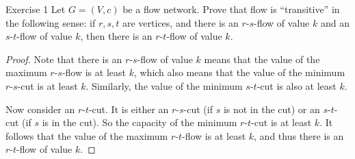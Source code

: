


    \maketitle

    \begin{thm}{Exercise 1}{}
        Let $G = (V, c)$ be a flow network. Prove that flow is ``transitive'' in the following sense: if $r, s, t$ are vertices, and there is an $r$-$s$-flow of value $k$ and an $s$-$t$-flow of value $k$, then there is an $r$-$t$-flow of value $k$.
    \end{thm}

    \begin{proof}
        Note that there is an $r$-$s$-flow of value $k$ means that the value of the maximum $r$-$s$-flow is at least $k$, which also means that the value of the minimum $r$-$s$-cut is at least $k$. Similarly, the value of the minimum $s$-$t$-cut is also at least $k$.
        
        Now consider an $r$-$t$-cut. It is either an $r$-$s$-cut (if $s$ is not in the cut) or an $s$-$t$-cut (if $s$ is in the cut). So the capacity of the minimum $r$-$t$-cut is at least $k$. It follows that the value of the maximum $r$-$t$-flow is at least $k$, and thus there is an $r$-$t$-flow of value $k$.
    \end{proof}

    \newpage

